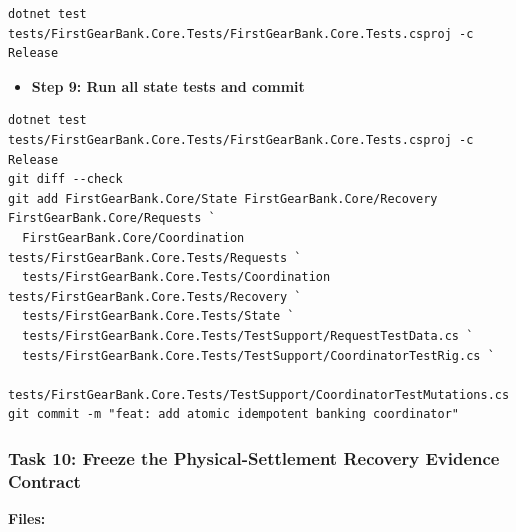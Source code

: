 \documentclass[
  10pt,
  letterpaper,
]{article}
\providecommand{\tightlist}{%
  \setlength{\itemsep}{0pt}\setlength{\parskip}{0pt}}
\begin{document}
\begin{lstlisting}
dotnet test tests/FirstGearBank.Core.Tests/FirstGearBank.Core.Tests.csproj -c Release
\end{lstlisting}

\begin{itemize}
\tightlist
\item[$\square$]
  \textbf{Step 9: Run all state tests and commit}
\end{itemize}

\begin{lstlisting}
dotnet test tests/FirstGearBank.Core.Tests/FirstGearBank.Core.Tests.csproj -c Release
git diff --check
git add FirstGearBank.Core/State FirstGearBank.Core/Recovery FirstGearBank.Core/Requests `
  FirstGearBank.Core/Coordination tests/FirstGearBank.Core.Tests/Requests `
  tests/FirstGearBank.Core.Tests/Coordination tests/FirstGearBank.Core.Tests/Recovery `
  tests/FirstGearBank.Core.Tests/State `
  tests/FirstGearBank.Core.Tests/TestSupport/RequestTestData.cs `
  tests/FirstGearBank.Core.Tests/TestSupport/CoordinatorTestRig.cs `
  tests/FirstGearBank.Core.Tests/TestSupport/CoordinatorTestMutations.cs
git commit -m "feat: add atomic idempotent banking coordinator"
\end{lstlisting}

\subsubsection{Task 10: Freeze the Physical-Settlement Recovery Evidence
Contract}\label{task-10-freeze-the-physical-settlement-recovery-evidence-contract}

\textbf{Files:}
\end{document}
